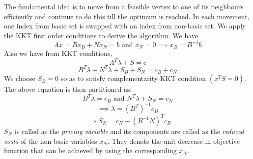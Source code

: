 \documentclass[12pt,letterpaper]{article}
\begin{document}
The fundamental idea is to move from a feasible vertex to one of its neighbours efficiently and continue to do this till the optimum is reached. In each movement, one index from basic set is swapped with an index from non-basic set. We apply the KKT first order conditions to derive the algorithm. We have
\begin{equation}
Ax = Bx_B + Nx_N = b \text{ and } x_N = 0 \implies x_B = B^{-1}b
\end{equation}
Also we have from KKT conditions,
\begin{equation*}
	A^T\lambda+S = c
\end{equation*}
\begin{equation}
		B^T\lambda+N^T\lambda+S_B+S_N=c_B+c_N
\end{equation}
We choose $S_B = 0$ so as to satisfy complementarity KKT condition $(x^TS=0)$. The above equation is then partitioned as,
\begin{equation*}
B^T\lambda = c_B \text{ and } N^T\lambda+S_N=c_N
\end{equation*}
\begin{equation}
\implies \lambda = (B^T)^{-1}c_B
\label{eqn3}
\end{equation}
\begin{equation}
\implies S_N = c_N - (B^{-1}N)^Tc_B
\end{equation}
$S_N$ is called as the \emph{pricing variable} and its components are called as the \emph{reduced costs} of the non-basic variables $x_N$. They denote the unit decrease in objective function that can be achieved by using the corresponding $x_N$.
\end{document}

